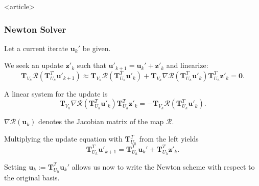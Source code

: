 \begin{frame}<article>
\frametitle<presentation>{Newton Solver}
Let a current iterate $\mathbf{u}_k'$ be given. 

We seek an update $\mathbf{z}'_k$ such that $\mathbf{u}'_{k+1} = \mathbf{u}_k'
+ \mathbf{z}'_k$ and linearize:
\begin{equation*}
\mathbf{T}_{V_h}\mathcal{R}\left(\mathbf{T}^T_{U_h}\mathbf{u}'_{k+1}\right) \approx 
\mathbf{T}_{V_h}\mathcal{R}\left(\mathbf{T}^T_{U_h}\mathbf{u}'_{k}\right) +
\mathbf{T}_{V_h}\nabla\mathcal{R}\left(\mathbf{T}^T_{U_h}\mathbf{u}'_{k}\right) 
\mathbf{T}^T_{U_h} \mathbf{z}'_{k} = \mathbf{0} .
\end{equation*}

A linear system for the update is 
\begin{equation}\label{eq:UnconstrainedUpdate}
\mathbf{T}_{V_h}\nabla\mathcal{R}\left(\mathbf{T}^T_{U_h}\mathbf{u}'_{k}\right) 
\mathbf{T}^T_{U_h} \mathbf{z}'_{k} = -
\mathbf{T}_{V_h}\mathcal{R}\left(\mathbf{T}^T_{U_h}\mathbf{u}'_{k}\right) .
\end{equation}

$\nabla\mathcal{R}\left(\mathbf{u}_{k}\right)$ denotes the
Jacobian matrix of the map $\mathcal{R}$. 

Multiplying the update equation with $\mathbf{T}^T_{U_h}$ from the left yields
\begin{equation}\label{eq:OriginalUpdate}
\mathbf{T}^T_{U_h}\mathbf{u}'_{k+1} = \mathbf{T}^T_{U_h}\mathbf{u}_k' +
\mathbf{T}^T_{U_h}\mathbf{z}'_k .
\end{equation}

Setting $\mathbf{u}_{k} := \mathbf{T}^T_{U_h}\mathbf{u}_k'$ allows us
now to write the Newton scheme with respect to the original basis.
\end{frame}


